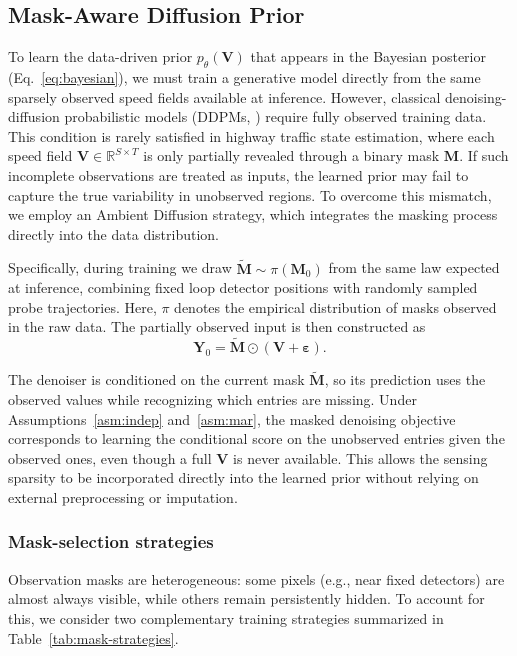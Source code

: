 \documentclass[a4paper,fleqn]{cas-sc}
\numberwithin{equation}{section}
\begin{document}
\subsection{Mask-Aware Diffusion Prior}
\label{sec:ambient}
To learn the data-driven prior \(p_\theta(\mathbf V)\) that appears in the Bayesian posterior (Eq.~\ref{eq:bayesian}), we must train a generative model directly from the same sparsely observed speed fields available at inference. However, classical denoising-diffusion probabilistic models (DDPMs, \cite{ho2020denoising}) require fully observed training data. This condition is rarely satisfied in highway traffic state estimation, where each speed field $\mathbf{V} \in \mathbb{R}^{S \times T}$ is only partially revealed through a binary mask $\mathbf{M}$. If such incomplete observations are treated as inputs, the learned prior may fail to capture the true variability in unobserved regions. To overcome this mismatch, we employ an Ambient Diffusion \citep{daras2023ambient} strategy, which integrates the masking process directly into the data distribution.

Specifically, during training we draw $\tilde{\mathbf M}\sim \pi(\mathbf M_0)$ from the same law expected at inference, combining fixed loop detector positions with randomly sampled probe trajectories. Here, $\pi$ denotes the empirical distribution of masks observed in the raw data. The partially observed input is then constructed as 
\begin{equation}
    \mathbf Y_0=\tilde{\mathbf M}\odot (\mathbf V + \boldsymbol\varepsilon).
\end{equation}

The denoiser is conditioned on the current mask $\tilde{\mathbf M}$, so its prediction uses the observed values while recognizing which entries are missing. Under Assumptions~\ref{asm:indep} and~\ref{asm:mar}, the masked denoising objective corresponds to learning the conditional score on the unobserved entries given the observed ones, even though a full $\mathbf V$ is never available. This allows the sensing sparsity to be incorporated directly into the learned prior without relying on external preprocessing or imputation.


\subsubsection{Mask-selection strategies}
Observation masks are heterogeneous: some pixels (e.g., near fixed detectors) are almost always visible, while others remain persistently hidden. To account for this, we consider two complementary training strategies summarized in Table~\ref{tab:mask-strategies}.
\end{document}

